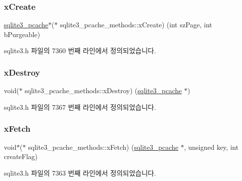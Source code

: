 \subsubsection{\texorpdfstring{x\+Create}{xCreate}}
{\footnotesize\ttfamily \hyperlink{sqlite3_8h_a096c453d937d51f7926d7d31c8e0bd2f}{sqlite3\+\_\+pcache}$\ast$($\ast$ sqlite3\+\_\+pcache\+\_\+methods\+::x\+Create) (int sz\+Page, int b\+Purgeable)}



sqlite3.\+h 파일의 7360 번째 라인에서 정의되었습니다.

\mbox{\label{structsqlite3__pcache__methods_ac775533f86db1d15bf7e4ded0e037eaf}} 
\subsubsection{\texorpdfstring{x\+Destroy}{xDestroy}}
{\footnotesize\ttfamily void($\ast$ sqlite3\+\_\+pcache\+\_\+methods\+::x\+Destroy) (\hyperlink{sqlite3_8h_a096c453d937d51f7926d7d31c8e0bd2f}{sqlite3\+\_\+pcache} $\ast$)}



sqlite3.\+h 파일의 7367 번째 라인에서 정의되었습니다.

\mbox{\label{structsqlite3__pcache__methods_ae09b8ed29c2dd77157f26a69255fd482}} 
\subsubsection{\texorpdfstring{x\+Fetch}{xFetch}}
{\footnotesize\ttfamily void$\ast$($\ast$ sqlite3\+\_\+pcache\+\_\+methods\+::x\+Fetch) (\hyperlink{sqlite3_8h_a096c453d937d51f7926d7d31c8e0bd2f}{sqlite3\+\_\+pcache} $\ast$, unsigned key, int create\+Flag)}



sqlite3.\+h 파일의 7363 번째 라인에서 정의되었습니다.

\mbox{\label{structsqlite3__pcache__methods_ac75d3dbf840e6f05ea08d35ad0457fb2}} 
